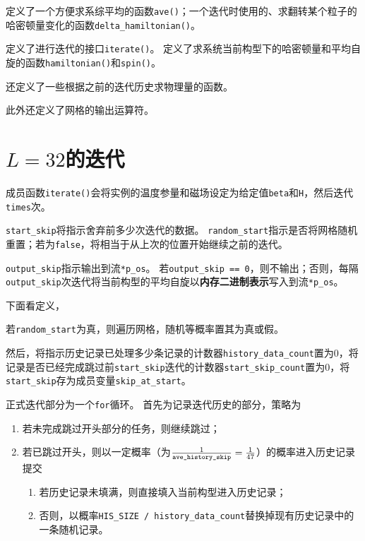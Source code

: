 \documentclass[a4paper,unicode]{report}
\begin{document}
定义了一个方便求系综平均的函数\verb|ave()|；一个迭代时使用的、求翻转某个粒子的哈密顿量变化的函数\verb|delta_hamiltonian()|。

定义了进行迭代的接口\verb|iterate()|。
定义了求系统当前构型下的哈密顿量和平均自旋的函数\verb|hamiltonian()|和\verb|spin()|。

还定义了一些根据之前的迭代历史求物理量的函数。

此外还定义了网格的输出运算符。

\section{\texorpdfstring{$L=32$}{L=32}的迭代}

成员函数\verb|iterate()|会将实例的温度参量和磁场设定为给定值\verb|beta|和\verb|H|，然后迭代\verb|times|次。

\verb|start_skip|将指示舍弃前多少次迭代的数据。
\verb|random_start|指示是否将网格随机重置；若为\verb|false|，将相当于从上次的位置开始继续之前的迭代。

\verb|output_skip|指示输出到流\verb|*p_os|。
若\verb|output_skip == 0|，则不输出；否则，每隔\verb|output_skip|次迭代将当前构型的平均自旋以\textbf{内存二进制表示}写入到流\verb|*p_os|。

下面看定义，
{
    \linespread{1.0}
    
}

若\verb|random_start|为真，则遍历网格，随机等概率置其为真或假。

然后，将指示历史记录已处理多少条记录的计数器\verb|history_data_count|置为0，将记录是否已经完成跳过前\verb|start_skip|迭代的计数器\verb|start_skip_count|置为0，将\verb|start_skip|存为成员变量\verb|skip_at_start|。

正式迭代部分为一个\texttt{for}循环。
首先为记录迭代历史的部分，策略为
\begin{enumerate}
    \item 若未完成跳过开头部分的任务，则继续跳过；
    \item 若已跳过开头，则以一定概率（为$\frac{1}{\text{\texttt{ave\_history\_skip}}} = \frac{1}{47}$）的概率进入历史记录提交
    \begin{enumerate}
        \item 若历史记录未填满，则直接填入当前构型进入历史记录；
        \item 否则，以概率\verb|HIS_SIZE / history_data_count|替换掉现有历史记录中的一条随机记录。
    \end{enumerate}
\end{enumerate}
\end{document}
